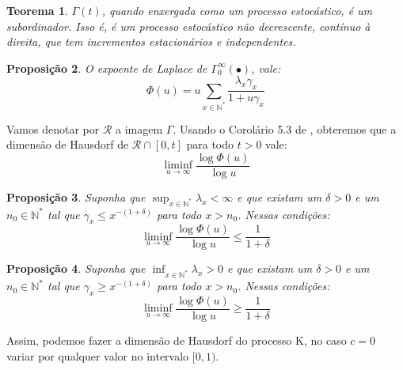 \documentclass[11pt,twoside,a4paper]{article}
\newcommand{\RR}{\mathcal{R}}
\newcommand{\Nz}{{\mathbb{N^*}}}
\newtheorem{teorema}{Teorema}[section]
\newtheorem{proposicao}[teorema]{Proposição}
\begin{document}
\begin{teorema}
  $\Gamma(t)$, quando enxergada como um processo estocástico, é um
  subordinador. Isso é, é um processo estocástico não decrescente,
  contínuo à direita, que tem incrementos estacionários e independentes.
\end{teorema}

\begin{proposicao}
  O expoente de Laplace de $\Gamma^\infty_0(\bullet)$, vale:
  \begin{equation}
    \label{eq:exp-laplace}
    \Phi(u) = 
    u \sum_{x \in \Nz} \frac{\lambda_x \gamma_x}{1 + u \gamma_x}
  \end{equation}
\end{proposicao}


Vamos denotar por $\RR$ a imagem $\Gamma$. Usando o Corolário 5.3 de
\cite{bertoin:97}, obteremos que a dimensão de Hausdorf de $\RR \cap
[0, t]$ para todo $t > 0$ vale:
\begin{equation}
  \label{eq:dim-hausdorf}
  \liminf_{u \to \infty} \frac{\log \Phi(u)}{\log u} 
\end{equation}

\begin{proposicao}
  Suponha que $\sup_{x\in\Nz}\lambda_x < \infty$ e que existam um
  $\delta>0$ e um $n_0 \in \Nz$ tal que $\gamma_x \leq x^{-(1+\delta)}$
  para todo $x > n_0$. Nessas condições:
  \begin{equation}
    \liminf_{u \to \infty} \frac{\log \Phi(u)}{\log u}  \leq \frac{1}{1+\delta}
  \end{equation}
\end{proposicao}

\begin{proposicao}
  Suponha que $\inf_{x\in\Nz}\lambda_x  > 0$ e que existam um
  $\delta>0$ e um $n_0 \in \Nz$ tal que $\gamma_x \geq x^{-(1+\delta)}$
  para todo $x > n_0$. Nessas condições:
  \begin{equation}
    \liminf_{u \to \infty} \frac{\log \Phi(u)}{\log u}  \geq \frac{1}{1+\delta}
  \end{equation}
\end{proposicao}

Assim, podemos fazer a dimensão de Hausdorf do processo K, no caso $c
= 0$ variar por qualquer valor no intervalo $[0, 1)$.


\singlespacing   %
\end{document}
